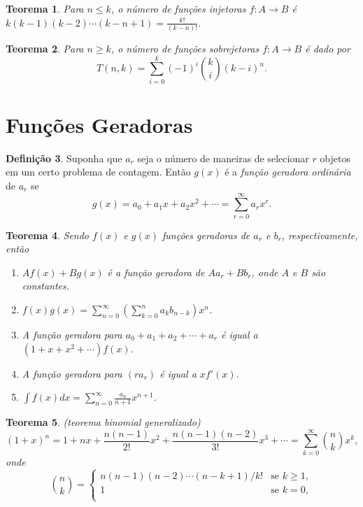 \documentclass[12pt]{article}
\theoremstyle{plain}
\newtheorem{thm}{Teorema}[section]
\theoremstyle{definition}
\newtheorem{defn}[thm]{Definição}
\theoremstyle{remark}
\begin{document}
\begin{thm}
    Para \(n \leq k\), o número de funções injetoras \(f: A \to B\) é \(k(k-1)(k-2)\cdots(k-n+1) = \displaystyle\frac{k!}{(k-n)!}\).
\end{thm}

\begin{thm}
    Para \(n \geq k\), o número de funções sobrejetoras \(f: A \to B\) é dado por
    \begin{equation}
        T(n,k) = \sum_{i=0}^{k} (-1)^i \binom{k}{i} (k-i)^n.
    \end{equation}
\end{thm}

\section{Funções Geradoras}

\begin{defn}
    Suponha que \(a_r\) seja o número de maneiras de selecionar \(r\) objetos em um certo problema de contagem. Então \(g(x)\) é a \emph{função geradora ordinária} de \(a_r\) se
    \begin{equation}
        g(x) = a_0 + a_1 x + a_2 x^2 + \cdots = \sum_{r=0}^{\infty} a_r x^r.
    \end{equation}
\end{defn}

\begin{thm} Sendo \(f(x)\) e \(g(x)\) funções geradoras de \(a_r\) e \(b_r\), respectivamente, então
    \begin{enumerate}
        \item[\textup{(a)}] \(Af(x) + Bg(x)\) é a função geradora de \(Aa_r + Bb_r\), onde \(A\) e \(B\) são constantes.
        \item[\textup{(b)}] \(\displaystyle f(x)g(x) = \sum_{n=0}^{\infty} \left( \sum_{k=0}^{n} a_k b_{n-k} \right) x^n\).
        \item[\textup{(c)}] A função geradora para \(a_0+a_1+a_2+\cdots+a_r\) é igual a \((1+x+x^2+\cdots)f(x)\).
        \item[\textup{(d)}] A função geradora para \((ra_r)\) é igual a \(xf'(x)\).
        \item[\textup{(e)}] \(\displaystyle \int f(x) dx = \sum_{n=0}^{\infty} \frac{a_n}{n+1} x^{n+1}\).
    \end{enumerate}
\end{thm}

\begin{thm} (teorema binomial generalizado)
    \begin{equation}
        (1+x)^n=1+nx+\frac{n(n-1)}{2!}x^2+\frac{n(n-1)(n-2)}{3!}x^3+\cdots = \sum_{k=0}^{\infty} \binom{n}{k} x^k,
    \end{equation}
    \noindent onde
    \[
        \binom{n}{k} = \begin{cases}
            n(n-1)(n-2)\cdots(n-k+1)/k! & \text{se } k \geq 1, \\
            1 & \text{se } k=0, \\
        \end{cases}
    \]
\end{thm}
\end{document}
